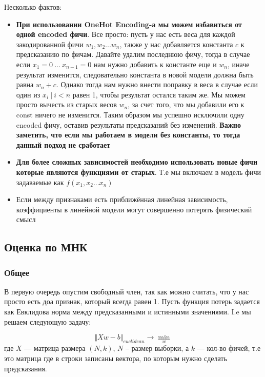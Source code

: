 \documentclass{article}
\begin{document}
    Несколько фактов:

    \begin{itemize}
        \item \textbf{При использовании OneHot Encoding-а мы можем избавиться от одной encoded фичи}.
        Все просто: пусть у нас есть веса для каждой закодированной фичи $w_{1}, w_{2} ... w_{n}$, также у нас добавляется константа $c$
        к предсказанию по фичам.
        Давайте удалим последнюю фичу, тогда в случае если $x_{1} = 0 \ ... \ x_{n-1} = 0$ нам нужно добавить к константе еще и $w_{n}$, иначе результат изменится, следовательно
        константа в новой модели должна быть равна $w_{n} + c$. 
        Однако тогда нам нужно внести поправку в веса в случае если один из $x_{i} \ | \ i < n$ равен 1, чтобы
        результат остался таким же. 
        Мы можем просто вычесть из старых весов $w_{n}$, за счет того, что мы добавили его к const ничего не изменится.
        Таким образом мы успешно исключили одну encoded фичу, оставив результаты предсказаний без изменений. 
        \textbf{Важно заметить, что если мы работаем в модели без константы, то тогда данный подход не сработает}
        \item \textbf{Для более сложных зависимостей необходимо использовать новые фичи которые являются функциями от старых}.
        Т.е мы включаем в модель фичи задаваемые как $f(x_{1}, x_{2} ... x_{n})$
        \item Если между признаками есть приближённая линейная зависимость, коэффициенты в линейной модели могут совершенно потерять физический смысл
  
    \end{itemize}
    
    \subsection{Оценка по МНК}

    \subsubsection{Общее}

    В первую очередь опустим свободный член, так как можно считать, что у нас просто есть доа признак, который всегда равен 1.
    Пусть функция потерь задается как Евклидова норма между предсказанными и истинными значениями.
    I.e мы решаем следующую задачу:

    \begin{equation}
        \Vert Xw - b \Vert_{euclidean} \rightarrow \min_{w}
    \end{equation}
    где $X$ --- матрица размера $(N, k)$, $N$ -- размер выборки, а $k$ --- кол-во фичей, т.е это матрица где в строки записаны вектора,
    по которым нужно сделать предсказания.
\end{document}

